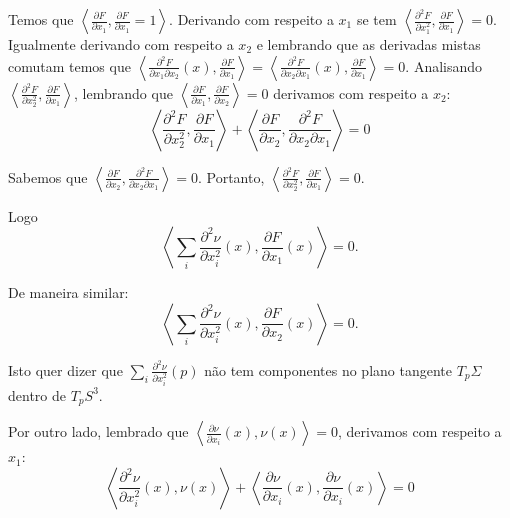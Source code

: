 \begin{demonstracao}
	Temos que $\left\langle \frac{\partial F}{\partial x_1}, \frac{\partial F}{\partial x_1} = 1 \right\rangle$. Derivando com respeito a $x_1$ se tem $\left\langle \frac{\partial^2 F}{\partial x_1^2}, \frac{\partial F}{\partial x_1} \right\rangle = 0$. Igualmente derivando com respeito a $x_2$ e lembrando que as derivadas mistas comutam temos que $\left\langle \frac{\partial^2 F}{\partial x_1 \partial x_2}(x), \frac{\partial F}{\partial x_1} \right\rangle = \left\langle \frac{\partial^2 F}{\partial x_2 \partial x_1}(x), \frac{\partial F}{\partial x_1} \right\rangle = 0$. Analisando $\left\langle \frac{\partial^2 F}{\partial x_2^2}, \frac{\partial F}{\partial x_1} \right\rangle$, lembrando que $\left\langle \frac{\partial F}{\partial x_1}, \frac{\partial F}{\partial x_2} \right\rangle = 0$ derivamos com respeito a $x_2$:
	\begin{equation*}
		\left\langle \frac{\partial^2 F}{\partial x_2^2}, \frac{\partial F}{\partial x_1} \right\rangle + \left\langle \frac{\partial F}{\partial x_2}, \frac{\partial^2 F}{\partial x_2 \partial x_1} \right\rangle = 0
	\end{equation*}
	
	Sabemos que $\left\langle \frac{\partial F}{\partial x_2}, \frac{\partial^2 F}{\partial x_2 \partial x_1} \right\rangle = 0$. Portanto, $\left\langle \frac{\partial^2 F}{\partial x_2^2}, \frac{\partial F}{\partial x_1} \right\rangle = 0$.
	
	Logo
	\begin{equation*}
		\left\langle \sum_i \frac{\partial^2 \nu}{\partial x_i^2}(x), \frac{\partial F}{\partial x_1}(x) \right\rangle = 0.
	\end{equation*}
	
	De maneira similar:
	\begin{equation*}
		\left\langle \sum_i \frac{\partial^2 \nu}{\partial x_i^2}(x), \frac{\partial F}{\partial x_2}(x) \right\rangle = 0.
	\end{equation*}
	
	Isto quer dizer que $\sum_i \frac{\partial^2 \nu}{\partial x_i^2}(p)$ não tem componentes no plano tangente $T_p \Sigma$ dentro de $T_p S^3$.
	
	Por outro lado, lembrado que $\left\langle \frac{\partial \nu}{\partial x_i}(x), \nu(x) \right\rangle = 0$, derivamos com respeito a $x_1$:
	\begin{equation*}
		\left\langle \frac{\partial^2 \nu}{\partial x_i^2}(x), \nu(x) \right\rangle + \left\langle \frac{\partial \nu}{\partial x_i}(x), \frac{\partial \nu}{\partial x_i}(x) \right\rangle = 0
	\end{equation*}
	

\end{demonstracao}
